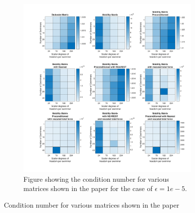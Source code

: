 \begin{figure}
\ContinuedFloat
     \centering
     \begin{subfigure}[b]{0.49\textheight}
        \captionsetup{width=0.49\textwidth}
        \includegraphics[height=0.49\textheight,keepaspectratio]{Images/Condition/Condition-5.pdf}
        \caption{Figure showing the condition number for various matrices shown in the paper for the case of $\epsilon=1e-5$.}
        \label{fig:Condition5}
     \end{subfigure}
    \caption{Condition number for various matrices shown in the paper}
\end{figure}


